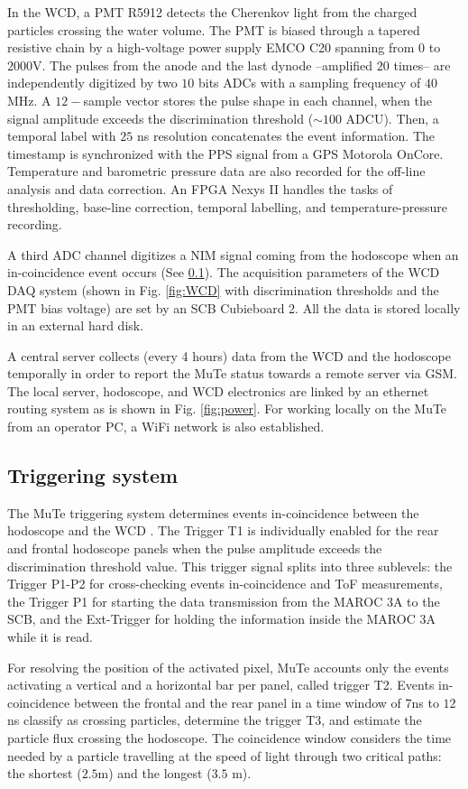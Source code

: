 \documentclass[letterpaper,11pt]{article}
\begin{document}
In the WCD, a PMT R5912 detects the Cherenkov light from the charged particles crossing the water volume. The PMT is biased through a tapered resistive chain by a high-voltage power supply EMCO C20 spanning from $0$ to $2000$V. The pulses from the anode and the last dynode --amplified $20$ times-- are independently digitized by two $10$ bits ADCs with a sampling frequency of $40$ MHz. A $12-$sample vector stores the pulse shape in each channel,  when the signal amplitude exceeds the discrimination threshold ($\sim 100$ ADCU).  Then, a temporal label with $25$ ns resolution concatenates the event information. The timestamp is synchronized with the PPS signal from a GPS Motorola OnCore. Temperature and barometric pressure data are also recorded for the off-line analysis and data correction. An FPGA Nexys II handles the tasks of thresholding, base-line correction, temporal labelling, and temperature-pressure recording.

A third ADC channel digitizes a NIM signal coming from the hodoscope when an in-coincidence event occurs (See \ref{trigger}). The acquisition parameters of the WCD DAQ system (shown in Fig. \ref{fig:WCD} with discrimination thresholds and the PMT bias voltage) are set by an SCB Cubieboard 2. All the data is stored locally in an external hard disk. 

A central server collects (every 4 hours) data from the WCD and the hodoscope temporally in order to report the MuTe status towards a remote server via GSM. The local server, hodoscope, and WCD electronics are linked by an ethernet routing system as is shown in Fig. \ref{fig:power}. For working locally on the MuTe from an operator PC, a WiFi network is also established.


\subsection{Triggering system}
\label{trigger}
The MuTe triggering system determines events in-coincidence between the hodoscope and the WCD \cite{PeaRodrguez2019}. The Trigger T1 is individually enabled for the rear and frontal hodoscope panels when the pulse amplitude exceeds the discrimination threshold value. This trigger signal splits into three sublevels: the Trigger P1-P2 for cross-checking events in-coincidence and ToF measurements, the Trigger P1 for starting the data transmission from the MAROC 3A to the SCB, and the Ext-Trigger for holding the information inside the MAROC 3A while it is read.

For resolving the position of the activated pixel, MuTe accounts only the events activating a vertical and a horizontal bar per panel, called trigger T2. Events in-coincidence between the frontal and the rear panel in a time window of $7$ns to $12$ns classify as crossing particles, determine the trigger T3, and estimate the particle flux crossing the hodoscope. The coincidence window considers the time needed by a particle travelling at the speed of light through two critical paths: the shortest ($2.5$m) and the longest ($3.5$ m).
\end{document}
